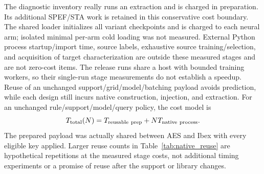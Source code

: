 \documentclass[conference,9pt,letterpaper]{IEEEtran}
\begin{document}
\begin{table}[t]
\centering\scriptsize\setlength{\tabcolsep}{3pt}
\caption{Sparse-native costs (seconds), averaged over two budgets and
three support seeds per layout. B/F denote Binary/Full. Prep includes
shared support release, diagnostic inventory, shared model loading,
and arm-specific prediction. PEX includes native construction/injection.
$^*$Total is a sum of measured stages, including native process/SPEF/STA,
not an independently timed standalone cold launch.}
\label{tab:sparse_native_cost}
\end{table}
The diagnostic inventory really runs an extraction and is charged in
preparation. Its additional SPEF/STA work is retained in this conservative
cost boundary. The shared loader initializes all variant checkpoints and
is charged to each neural arm; isolated minimal per-arm cold loading was
not measured. External Python process startup/import time, source labels, exhaustive source
training/selection, and acquisition of target characterization are outside these
measured stages and are not zero-cost items.
The release runs share a host with bounded training workers, so their
single-run stage measurements do not establish a speedup. Reuse of an
unchanged support/grid/model/batching payload avoids prediction, while
each design still incurs native construction, injection, and extraction.
For an unchanged rule/support/model/query policy, the cost model is
\begin{equation}
T_{\rm total}(N)=T_{\rm reusable\ prep}+N T_{\rm native\ process}.
\end{equation}
The prepared payload was actually shared between AES and Ibex with every
eligible key applied. Larger reuse counts in Table~\ref{tab:native_reuse}
are hypothetical repetitions at the measured stage costs, not additional
timing experiments or a promise of reuse after the support or library changes.
\begin{table}[t]
\centering\small
\caption{Modeled seconds per design, $T_{\rm total}(N)/N$, averaged over the
48 settings. All columns are stage-based models, including $N=1$.
The native process includes PEX, SPEF, STA and process overhead. Native-sparse
needs no inventory/inference; its support-release cost was separately measured
with warm/uncontrolled cache. These are not equal-accuracy speedups.}
\label{tab:native_reuse}
\end{table}
\end{document}
